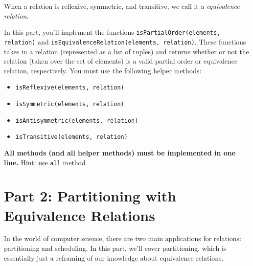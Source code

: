 \documentclass{article}
\begin{document}
When a relation is reflexive, symmetric, and transitive, we call it a \textit{equivalence relation}.





    \vspace{3mm}
    \begin{tcolorbox}[colback=yellow!30]
        In this part, you'll implement the functions \lstinline{isPartialOrder(elements, relation)} and \lstinline{isEquivalenceRelation(elements, relation)}. These functions takes in a relation (represented as a list of tuples) and returns whether or not the relation (taken over the set of elements) is a valid partial order or equivalence relation, respectively. You must use the following helper methods:
        \begin{itemize}
            \item \lstinline{isReflexive(elements, relation)}
            \item \lstinline{isSymmetric(elements, relation)}
            \item \lstinline{isAntisymmetric(elements, relation)}
            \item \lstinline{isTransitive(elements, relation)}
        \end{itemize}
        \textbf{All methods (and all helper methods) must be implemented in one line.}
        Hint: use \lstinline{all} method
    \end{tcolorbox}



\section*{Part 2: Partitioning with Equivalence Relations}
    In the world of computer science, there are two main applications for relations: partitioning and scheduling. In this part, we'll cover partitioning, which is essentially just a reframing of our knowledge about equivalence relations. 
    
\end{document}

